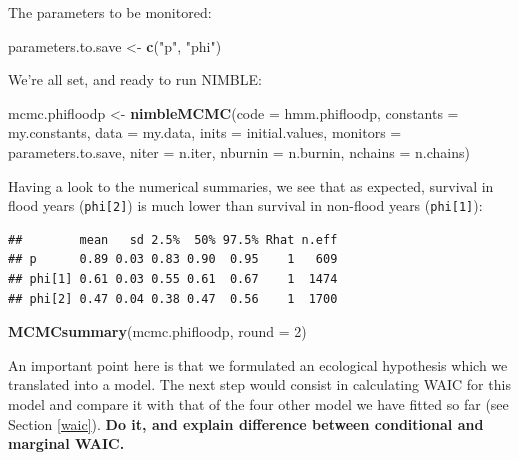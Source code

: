 \documentclass[
  12pt,
]{krantz}
\newenvironment{Shaded}{\begin{snugshade}}{\end{snugshade}}
\newcommand{\AttributeTok}[1]{\textcolor[rgb]{0.13,0.29,0.53}{#1}}
\newcommand{\DecValTok}[1]{\textcolor[rgb]{0.00,0.00,0.81}{#1}}
\newcommand{\FunctionTok}[1]{\textcolor[rgb]{0.13,0.29,0.53}{\textbf{#1}}}
\newcommand{\NormalTok}[1]{#1}
\newcommand{\OtherTok}[1]{\textcolor[rgb]{0.56,0.35,0.01}{#1}}
\newcommand{\StringTok}[1]{\textcolor[rgb]{0.31,0.60,0.02}{#1}}
\begin{document}
The parameters to be monitored:

\begin{Shaded}
\begin{Highlighting}[]
\NormalTok{parameters.to.save }\OtherTok{\textless{}{-}} \FunctionTok{c}\NormalTok{(}\StringTok{"p"}\NormalTok{, }\StringTok{"phi"}\NormalTok{)}
\end{Highlighting}
\end{Shaded}

We're all set, and ready to run NIMBLE:

\begin{Shaded}
\begin{Highlighting}[]
\NormalTok{mcmc.phifloodp }\OtherTok{\textless{}{-}} \FunctionTok{nimbleMCMC}\NormalTok{(}\AttributeTok{code =}\NormalTok{ hmm.phifloodp, }
                             \AttributeTok{constants =}\NormalTok{ my.constants,}
                             \AttributeTok{data =}\NormalTok{ my.data,              }
                             \AttributeTok{inits =}\NormalTok{ initial.values,}
                             \AttributeTok{monitors =}\NormalTok{ parameters.to.save,}
                             \AttributeTok{niter =}\NormalTok{ n.iter,}
                             \AttributeTok{nburnin =}\NormalTok{ n.burnin, }
                             \AttributeTok{nchains =}\NormalTok{ n.chains)}
\end{Highlighting}
\end{Shaded}

Having a look to the numerical summaries, we see that as expected, survival in flood years (\texttt{phi{[}2{]}}) is much lower than survival in non-flood years (\texttt{phi{[}1{]}}):

\begin{verbatim}
##        mean   sd 2.5%  50% 97.5% Rhat n.eff
## p      0.89 0.03 0.83 0.90  0.95    1   609
## phi[1] 0.61 0.03 0.55 0.61  0.67    1  1474
## phi[2] 0.47 0.04 0.38 0.47  0.56    1  1700
\end{verbatim}

\begin{Shaded}
\begin{Highlighting}[]
\FunctionTok{MCMCsummary}\NormalTok{(mcmc.phifloodp, }\AttributeTok{round =} \DecValTok{2}\NormalTok{)}
\end{Highlighting}
\end{Shaded}

An important point here is that we formulated an ecological hypothesis which we translated into a model. The next step would consist in calculating WAIC for this model and compare it with that of the four other model we have fitted so far (see Section \ref{waic}). \textbf{Do it, and explain difference between conditional and marginal WAIC.}
\end{document}
